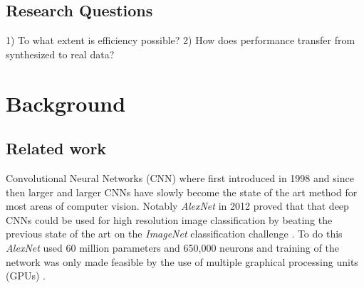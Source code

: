 \documentclass{kththesis}
\newcommand{\bibentry}[1]{\parencite{#1}}
\begin{document}
\section{Research Questions}
1) To what extent is efficiency possible?
2) How does performance transfer from synthesized to real data?

\chapter{Background}
\section{Related work}
Convolutional Neural Networks (CNN) where first introduced in 1998 \bibentry{lecun1998gradient} and since then larger and larger CNNs have slowly become the state of the art method for most areas of computer vision. Notably \emph{AlexNet} \bibentry{krizhevsky2012imagenet} in 2012 proved that that deep CNNs could be used for high resolution image classification by beating the previous state of the art \bibentry{sanchez2011high} on the \emph{ImageNet} classification challenge \bibentry{deng2009imagenet}. To do this \emph{AlexNet} used 60 million parameters and 650,000 neurons and training of the network was only made feasible by the use of multiple graphical processing units (GPUs) \bibentry{krizhevsky2012imagenet}. 
\end{document}
